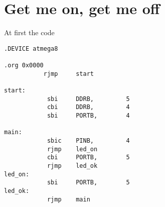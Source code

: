 \section{Get me on, get me off}

At first the code

\begin{lstlisting}
.DEVICE atmega8

.org 0x0000
           rjmp     start

start:
            sbi     DDRB,         5
            cbi     DDRB,         4
            sbi     PORTB,        4

main:
            sbic    PINB,         4
            rjmp    led_on
            cbi     PORTB,        5
            rjmp    led_ok
led_on:
            sbi     PORTB,        5
led_ok:
            rjmp    main
\end{lstlisting}


